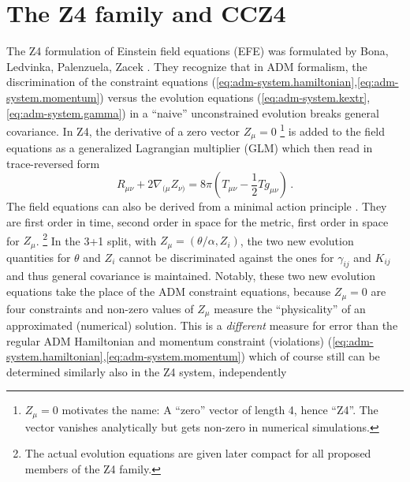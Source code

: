 

\section{The Z4 family and CCZ4}\label{sec:Z4-family}
The Z4 formulation of Einstein field equations (EFE) was formulated by Bona,
Ledvinka, Palenzuela, Zacek \cite{Bona:2003fj,Bona:2003qn}. They recognize that
in ADM formalism, the discrimination of the constraint equations
(\ref{eq:adm-system.hamiltonian},\ref{eq:adm-system.momentum}) versus the 
evolution equations
(\ref{eq:adm-system.kextr},\ref{eq:adm-system.gamma})
in a ``naive'' unconstrained evolution breaks general covariance. In Z4,
the derivative of a zero vector $Z_\mu=0$ \footnote{$Z_\mu=0$ motivates the 
name: A ``zero'' vector of length 4,	hence ``Z4''. The vector vanishes 
analytically but gets non-zero in numerical simulations.} is added to the field 
equations as a generalized Lagrangian multiplier (GLM)
which then read in trace-reversed form \cite{Bona:2003fj}
\begin{equation}\label{eq:z4-efe}
R_{\mu\nu} + 2\nabla_{(\mu} Z_{\nu)} = 8\pi \left( T_{\mu\nu} - \frac 12 T 
g_{\mu\nu} \right) \,.
\end{equation}
The field equations can also be derived from a minimal action principle
\cite{Bona:2010is}. They are first order in time, second order in space for the
metric, first order in space for $Z_\mu$. 
\footnote{The actual evolution equations are given later compact for all
	proposed members of the Z4 family.}
In the 3+1 split, with $Z_\mu = (\theta / \alpha, Z_i)$, the two new
evolution quantities for $\theta$ and $Z_i$ cannot be discriminated against
the ones for $\gamma_{ij}$ and $K_{ij}$ and thus general covariance is
maintained. Notably, these two new evolution equations take the place of the
ADM constraint equations, because $Z_\mu=0$ are four constraints and
non-zero values of $Z_\mu$ measure the ``physicality'' of an approximated
(numerical) solution. This is  a \emph{different} measure for
error than the regular
ADM Hamiltonian and momentum constraint (violations)
(\ref{eq:adm-system.hamiltonian},\ref{eq:adm-system.momentum}) which of course
still can be determined similarly also in the Z4 system, independently
